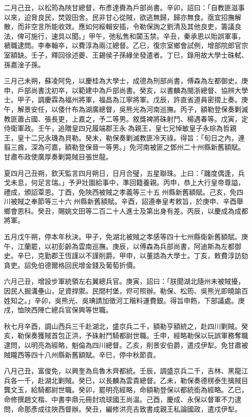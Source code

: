 \begin{pinyinscope}
二月己丑，以松筠為陜甘總督，布彥達賚為戶部尚書。辛卯，詔曰：「自教匪滋事以來，迫脅良民，焚毀田舍。民非甘心從賊，欲逃無歸，歸亦無食。亟宜招撫解散，而非空言所能收效。應如何綏輯安插，令勒保詢之劉清及其他良吏，籌議良法，俾可施行，速具以聞。」甲午，弛私售和闐玉禁。辛丑，秦承恩以貽誤軍事，褫職逮問。李奉翰卒，以費淳為兩江總督。乙巳，復宗室鄉會試例，增部院郎官宗室額缺。壬子，釋回徐述夔、王錫侯子孫緣坐發遣者。丁巳，錄用故大學士硃軾、孫嘉淦子孫。

三月己未朔，蘇凌阿免，以慶桂為大學士，成德為刑部尚書，傅森為左都御史。庚申，戶部尚書沈初卒，以範建中為戶部尚書。癸亥，以書麟為閩浙總督、協辨大學士。甲子，調慶霖為福州將軍，福昌為江寧將軍。戊辰，許直省道員密摺上奏。庚午，解景安任，以倭什布為湖廣總督，吳熊光為河南巡撫。丙子，額勒登保奏剿滅教匪蕭占國、張長更，上嘉之，予二等男。敘獎裨將硃射鬥、楊遇春等。戊寅，定侍衛軍政。壬午，追贈皇四兄履端郡王永為親王，皇七兄悼敏皇子永琮為哲親王，皇十二兄永璣為貝勒。癸未，勒保奏剿滅教匪冷天祿。得旨：「旬日之內，連翦三酋，深為可嘉，額勒登保晉一等男。」免河南被匪之鄧州二十州縣新舊額賦。甘肅布政使廣厚奏剿斃賊目張世龍。

夏四月己丑朔，欽天監言四月朔日，日月合璧，五星聯珠。上曰：「躔度偶逢，兵戈未息，何足言瑞。」予尹壯圖給事中，準回籍養親。丙申，恭上大行皇帝尊謚，禮成，頒詔覃恩。丁酉，免陜西被賊之孝義等三十五州縣新舊額賦。己亥，免四川被賊之奉節等三十六州縣新舊額賦。辛酉，詔遵奉皇考敕旨，於庚申、辛酉舉鄉會恩科。癸丑，賜姚文田等二百二十人進士及第出身有差。丙辰，以慶成為成都將軍。

五月戊午朔，停本年秋決。甲子，免湖北被賊之孝感等四十七州縣衛新舊額賦。庚午，江蘭罷，以初彭齡為雲南巡撫。庚辰，以傅森為兵部尚書，阿迪斯為左都御史。辛巳，克勤郡王恆謹以不謹削爵。甲申，以董誥為大學士。丁亥，敕費淳訪劾貪吏。詔免伯德爾格回民增金錢及葡萄折價。

六月己丑，增設步軍統領左右翼總兵官。庚寅，詔曰：「朕聞湖北隨州未被賊擾，因民人掘溝壘山，足資捍禦。民間村堡，侭可照辦。勒保、松筠、吳熊光即曉諭百姓知之。」辛卯，吳熊光、吳琠請加徵河工稭料運費銀。得旨申飭，下部議處。庚戌，恤陜西陣亡總兵官保興等世職。

秋七月辛酉，調山西兵三千赴湖北，盛京兵二千，額勒亨額統之，赴四川剿賊。癸亥，勒保奏獲賊首包正洪，予硃射鬥騎都尉世職。壬申，經略勒保以玩誤軍務奪職逮問，以明亮為經略，魁倫為四川總督。乙亥，削景安伯爵，遣戍伊犁。免甘肅被賊隴西等四十八州縣新舊額賦。辛巳，停中秋節貢。

八月己丑，富俊免，以興奎為烏魯木齊都統。壬辰，調盛京兵二千，吉林、黑龍江兵各一千，赴湖北剿賊。癸巳，以長麟為雲貴總督。乙未，勒保奏德楞泰生擒賊目龔文玉，給騎都尉世職。癸卯，罷明亮經略，命額勒登保以都統銜為經略。乙巳，命修撰趙文楷、中書李鼎元冊封琉球國王尚溫。己酉，慶成、永保以督軍不力逮問，命那彥成往陜西督辦。癸丑，編修洪亮吉致書成親王私論國政，遣戍伊犁。


\end{pinyinscope}
